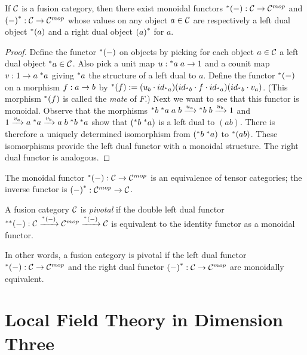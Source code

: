 \documentclass{amsart}
\begin{document}
\begin{proposition}
If $\mathcal C$ is a fusion category, then there exist monoidal functors ${}^*{(-)} : \mathcal C \rightarrow \mathcal C^{mop}$ and ${(-)}^* : \mathcal C \rightarrow \mathcal C^{mop}$ whose values on any object $a \in \mathcal C$ are respectively a left dual object ${}^*{(a)}$ and a right dual object ${(a)}^*$ for $a$.
\end{proposition}

\begin{proof}
Define the functor ${}^*{(-)}$ on objects by picking for each object $a \in \mathcal C$ a left dual object ${}^*{a} \in \mathcal C$.  Also pick a unit map $u: {}^*{a} \; a \rightarrow 1$ and a counit map $v: 1 \rightarrow a \; {}^*{a}$ giving ${}^*{a}$ the structure of a left dual to $a$.  Define the functor ${}^*{(-)}$ on a morphism $f: a \rightarrow b$ by ${}^*{(f)} := (u_b \cdot id_{{}^*{a}}) (id_{{}^*{b}} \cdot f \cdot id_{{}^*{a}}) (id_{{}^*{b}} \cdot v_a)$.  (This morphism ${}^*{(f)}$ is called the \emph{mate} of $F$.)  Next we want to see that this functor is monoidal.  Observe that the morphisms ${}^*{b} \; {}^*{a} \; a \; b \xrightarrow{u_a} {}^*{b} \; b \xrightarrow{u_b} 1$ and $1 \xrightarrow{v_a} a \; {}^*{a} \xrightarrow{v_b} a \; b \; {}^*{b} \; {}^*{a}$ show that $({}^*{b} \; {}^*{a})$ is a left dual to $(a b)$.  There is therefore a uniquely determined isomorphism from $({}^*{b} \; {}^*{a})$ to ${}^*{(a b)}$.  These isomorphisms provide the left dual functor with a monoidal structure.  The right dual functor is analogous.  %
\end{proof}

\begin{remark}
The monoidal functor ${}^*{(-)}: \mathcal C \rightarrow \mathcal C^{mop}$ is an equivalence of tensor categories; the inverse functor is ${(-)}^*: \mathcal C^{mop} \rightarrow \mathcal C$.
\end{remark}

\begin{definition}
A fusion category $\mathcal C$ is \emph{pivotal} if the double left dual functor ${}^{**}{(-)}: \mathcal C \xrightarrow{{}^*{(-)}} \mathcal C^{mop} \xrightarrow{{}^*{(-)}} \mathcal C$ is equivalent to the identity functor as a monoidal functor.
\end{definition}

In other words, a fusion category is pivotal if the left dual functor ${}^*{(-)}: \mathcal C \rightarrow \mathcal C^{mop}$ and the right dual functor ${(-)}^*: \mathcal C \rightarrow \mathcal C^{mop}$ are monoidally equivalent.


\section{Local Field Theory in Dimension Three} \label{sec-lft}
\end{document}
